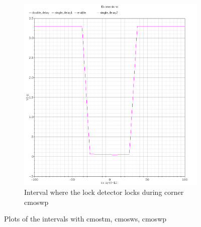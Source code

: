 \documentclass[a4paper,12pt]{article} \usepackage{graphicx}
\begin{document}
\begin{figure}
\begin{subfigure}[b]{.3\textwidth}
  \centering
        \includegraphics[width=\textwidth]{../Bilder/LD_tran/PD_wp.png}
        \caption{Interval where the lock detector locks during corner cmoswp}
\end{subfigure}
\caption{Plots of the intervals with cmostm, cmosws, cmoswp}
\label{fig:LD_tm_wp}
\end{figure}
\end{document}
